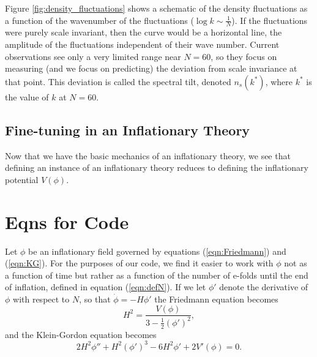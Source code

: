 \documentclass[onecolumn,apj]{emulateapj}
\def\half{\tfrac{1}{2}}
\begin{document}
Figure \ref{fig:density_fluctuations} shows a schematic of the density fluctuations as a function of the wavenumber of the fluctuations ($\log k\sim\tfrac{1}{N}$). If the fluctuations were purely scale invariant, then the curve would be a horizontal line, the amplitude of the fluctuations independent of their wave number. Current observations see only a very limited range near $N=60$, so they focus on measuring (and we focus on predicting) the deviation from scale invariance at that point. This deviation is called the spectral tilt, denoted $n_s(k^*)$, where $k^*$ is the value of $k$ at $N=60$. 



\subsection{Fine-tuning in an Inflationary Theory}
Now that we have the basic mechanics of an inflationary theory, we see that defining an instance of an inflationary theory reduces to defining the inflationary potential $V(\phi)$. 


\section{Eqns for Code}
Let $\phi$ be an inflationary field governed by equations (\ref{eqn:Friedmann}) and (\ref{eqn:KG}). For the purposes of our code, we find it easier to work with $\phi$ not as a function of time but rather as a function of the number of e-folds until the end of inflation, defined in equation (\ref{eqn:defN}). If we let $\phi'$ denote the derivative of $\phi$ with respect to $N$, so that $\dot \phi = -H \phi'$ the Friedmann equation becomes
\begin{equation}
H^2 = \frac{V(\phi)}{3 - \half(\phi')^2},
\end{equation}
and the Klein-Gordon equation becomes 
\begin{equation}
2H^2\phi'' + H^2(\phi')^3 - 6H^2\phi' + 2V'(\phi) = 0.
\label{eqn:KG_N}
\end{equation}
\end{document}
